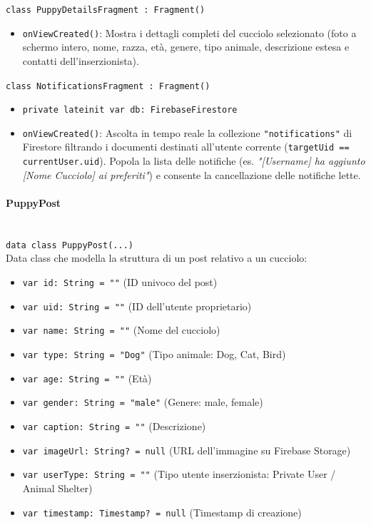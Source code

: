 \documentclass[a4paper]{report}
\begin{document}
\texttt{class PuppyDetailsFragment : Fragment()}
\begin{itemize}
    \item \texttt{onViewCreated()}: Mostra i dettagli completi del cucciolo selezionato (foto a schermo intero, nome, razza, età, genere, tipo animale, descrizione estesa e contatti dell'inserzionista).
\end{itemize}

\texttt{class NotificationsFragment : Fragment()}
\begin{itemize}
    \item \texttt{private lateinit var db: FirebaseFirestore}
    \item \texttt{onViewCreated()}: Ascolta in tempo reale la collezione \texttt{"notifications"} di Firestore filtrando i documenti destinati all'utente corrente (\texttt{targetUid == currentUser.uid}). Popola la lista delle notifiche (es. \textit{"[Username] ha aggiunto [Nome Cucciolo] ai preferiti"}) e consente la cancellazione delle notifiche lette.
\end{itemize}


\paragraph*{PuppyPost} \mbox{}\\[0.1cm]
\texttt{data class PuppyPost(...)} \\
Data class che modella la struttura di un post relativo a un cucciolo:
\begin{itemize}
    \item \texttt{var id: String = ""} (ID univoco del post)
    \item \texttt{var uid: String = ""} (ID dell'utente proprietario)
    \item \texttt{var name: String = ""} (Nome del cucciolo)
    \item \texttt{var type: String = "Dog"} (Tipo animale: Dog, Cat, Bird)
    \item \texttt{var age: String = ""} (Età)
    \item \texttt{var gender: String = "male"} (Genere: male, female)
    \item \texttt{var caption: String = ""} (Descrizione)
    \item \texttt{var imageUrl: String? = null} (URL dell'immagine su Firebase Storage)
    \item \texttt{var userType: String = ""} (Tipo utente inserzionista: Private User / Animal Shelter)
    \item \texttt{var timestamp: Timestamp? = null} (Timestamp di creazione)
\end{itemize}
\end{document}
